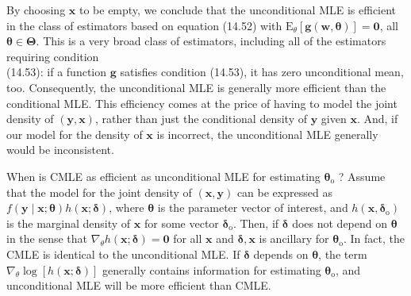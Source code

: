 \documentclass[10pt]{article}
\begin{document}
By choosing $\mathbf{x}$ to be empty, we conclude that the unconditional MLE is efficient in the class of estimators based on equation (14.52) with $\mathrm{E}_{\theta}[\mathbf{g}(\mathbf{w}, \boldsymbol{\theta})]=\mathbf{0}$, all $\boldsymbol{\theta} \in \boldsymbol{\Theta}$. This is a very broad class of estimators, including all of the estimators requiring condition\\
(14.53): if a function $\mathbf{g}$ satisfies condition (14.53), it has zero unconditional mean, too. Consequently, the unconditional MLE is generally more efficient than the conditional MLE. This efficiency comes at the price of having to model the joint density of $(\mathbf{y}, \mathbf{x})$, rather than just the conditional density of $\mathbf{y}$ given $\mathbf{x}$. And, if our model for the density of $\mathbf{x}$ is incorrect, the unconditional MLE generally would be inconsistent.

When is CMLE as efficient as unconditional MLE for estimating $\boldsymbol{\theta}_{\mathrm{o}}$ ? Assume that the model for the joint density of $(\mathbf{x}, \mathbf{y})$ can be expressed as $f(\mathbf{y} \mid \mathbf{x} ; \boldsymbol{\theta}) h(\mathbf{x} ; \boldsymbol{\delta})$, where $\boldsymbol{\theta}$ is the parameter vector of interest, and $h\left(\mathbf{x}, \boldsymbol{\delta}_{\mathrm{o}}\right)$ is the marginal density of $\mathbf{x}$ for some vector $\boldsymbol{\delta}_{\mathrm{o}}$. Then, if $\boldsymbol{\delta}$ does not depend on $\boldsymbol{\theta}$ in the sense that $\nabla_{\theta} h(\mathbf{x} ; \boldsymbol{\delta})=\mathbf{0}$ for all $\mathbf{x}$ and $\boldsymbol{\delta}, \mathbf{x}$ is ancillary for $\boldsymbol{\theta}_{\mathrm{o}}$. In fact, the CMLE is identical to the unconditional MLE. If $\boldsymbol{\delta}$ depends on $\boldsymbol{\theta}$, the term $\nabla_{\theta} \log [h(\mathbf{x} ; \boldsymbol{\delta})]$ generally contains information for estimating $\boldsymbol{\theta}_{\mathrm{o}}$, and unconditional MLE will be more efficient than CMLE.
\end{document}
